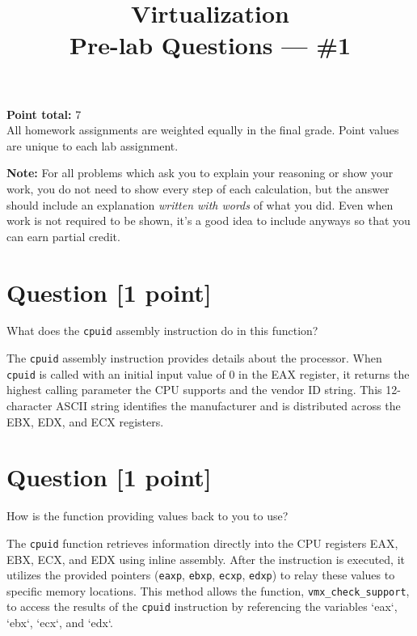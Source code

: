 \documentclass[11pt]{article}
\providecommand{\due}{}
\begin{document}
\title{Virtualization\\Pre-lab Questions --- \#1}
\date{\due}

\maketitle

\noindent \textbf{Point total:} 7
\\ All homework assignments are weighted equally in the final grade. Point values are unique to each lab assignment.

\textbf{Note:} For all problems which ask you to explain your reasoning or show your work, you do not need to show every step of each calculation, but the answer should include an explanation \emph{written with words} of what you did.  Even when work is not required to be shown, it’s a good idea to include anyways so that you can earn partial credit.

\section{Question [1 point]}

What does the \texttt{cpuid} assembly instruction do in this function?

\begin{solution}
    \item The \texttt{cpuid} assembly instruction provides details about the processor. When \texttt{cpuid} is called with an initial input value of 0 in the EAX register, it returns the highest calling parameter the CPU supports and the vendor ID string. This 12-character ASCII string identifies the manufacturer and is distributed across the EBX, EDX, and ECX registers.
\end{solution}


\section{Question [1 point]}

How is the function providing values back to you to use?

\begin{solution}
    \item The \texttt{cpuid} function retrieves information directly into the CPU registers EAX, EBX, ECX, and EDX using inline assembly. After the instruction is executed, it utilizes the provided pointers (\texttt{eaxp}, \texttt{ebxp}, \texttt{ecxp}, \texttt{edxp}) to relay these values to specific memory locations. This method allows the function, \texttt{vmx\_check\_support}, to access the results of the \texttt{cpuid} instruction by referencing the variables `eax`, `ebx`, `ecx`, and `edx`.

\end{solution}
\end{document}
